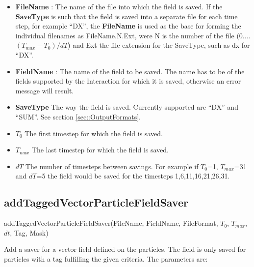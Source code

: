 \documentclass{report}
\begin{document}
\begin{itemize}
\item \textbf{FileName} : The name of the file into which the field is saved. If the  \textbf{SaveType} is such that the field is saved into a separate file for each time step, for example ``DX'', the \textbf{FileName} is used as the base for forming the individual filenames as FileName.N.Ext, were N is the number of the file (0....$(T_{max}-T_0)/dT$) and Ext the file extension for the SaveType, such as dx for ``DX''.
\item \textbf{FieldName} : The name of the field to be saved. The name has to be of the fields supported by the Interaction for which it is saved, otherwise an error message will result.
\item \textbf{SaveType} The way the field is saved. Currently supported are ``DX'' and ``SUM''. See section \ref{sec::OutputFormats}.
\item \textbf{$T_0$} The first timestep for which the field is saved.
\item \textbf{$T_{max}$} The last timestep for which the field is saved.
\item \textbf{$dT$} The number of timesteps between savings. For example if $T_0$=1, $T_{max}$=31 and $dT$=5 the field would be saved for the timesteps 1,6,11,16,21,26,31.
\end{itemize}


\subsection{addTaggedVectorParticleFieldSaver}

\textsf{addTaggedVectorParticleFieldSaver(FileName, FieldName, FileFormat, $T_0$, $T_{max}$, $dt$, Tag, Mask)}
\par \medskip

Add a saver for a vector field defined on the particles. The field is only saved for particles with a tag fulfilling the given criteria. The parameters are:
\end{document}
